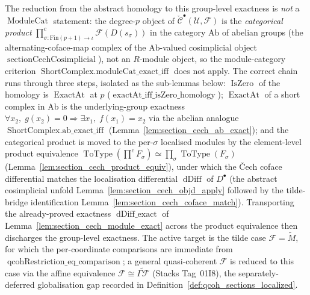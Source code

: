 \begin{lemma}
  The reduction from the abstract homology to this group-level exactness is \emph{not}
  a \(\operatorname{ModuleCat}\) statement: the degree-\(p\) object of
  \(\check{\mathcal{C}}^\bullet(\mathcal{U}, \mathcal{F})\) is the \emph{categorical
  product}
  \(\prod^{c}_{\sigma : \mathrm{Fin}(p+1) \to \iota}
  \mathcal{F}(D(s_\sigma))\) in the category \(\mathrm{Ab}\) of abelian groups (the
  alternating-coface-map complex of the \(\mathrm{Ab}\)-valued cosimplicial object
  \(\operatorname{sectionCechCosimplicial}\)), not an \(R\)-module object, so the
  module-category criterion \(\operatorname{ShortComplex.moduleCat\_exact\_iff}\) does
  not apply. The correct chain runs through three steps, isolated as the sub-lemmas
  below: \(\operatorname{IsZero}\) of the homology is \(\operatorname{ExactAt}\) at
  \(p\) (\(\operatorname{exactAt\_iff\_isZero\_homology}\)); \(\operatorname{ExactAt}\)
  of a short complex in \(\mathrm{Ab}\) is the underlying-group exactness
  \(\forall x_2,\; g(x_2) = 0 \Rightarrow \exists x_1,\; f(x_1) = x_2\) via the abelian
  analogue \(\operatorname{ShortComplex.ab\_exact\_iff}\)
  (Lemma~\ref{lem:section_cech_ab_exact}); and the categorical product is moved to the
  per-\(\sigma\) localised modules by the element-level product equivalence
  \(\operatorname{ToType}(\prod^{c} F_\sigma) \simeq \prod_\sigma
  \operatorname{ToType}(F_\sigma)\)
  (Lemma~\ref{lem:section_cech_product_equiv}), under which the {\v C}ech coface
  differential matches the localisation differential \(\operatorname{dDiff}\) of
  \(D^\bullet\) (the abstract cosimplicial unfold
  Lemma~\ref{lem:section_cech_objd_apply} followed by the tilde-bridge identification
  Lemma~\ref{lem:section_cech_coface_match}). Transporting the
  already-proved exactness \(\operatorname{dDiff\_exact}\) of
  Lemma~\ref{lem:section_cech_module_exact} across the product equivalence then
  discharges the group-level exactness. The active target is the tilde case
  \(\mathcal{F} = \widetilde{M}\), for which the per-coordinate comparisons are
  immediate from \(\operatorname{qcohRestriction\_eq\_comparison}\); a general
  quasi-coherent \(\mathcal{F}\) is reduced to this case via the affine equivalence
  \(\mathcal{F} \cong \widetilde{\Gamma\mathcal{F}}\) (Stacks Tag~01I8), the
  separately-deferred globalisation gap recorded in
  Definition~\ref{def:qcoh_sections_localized}.
\end{lemma}

